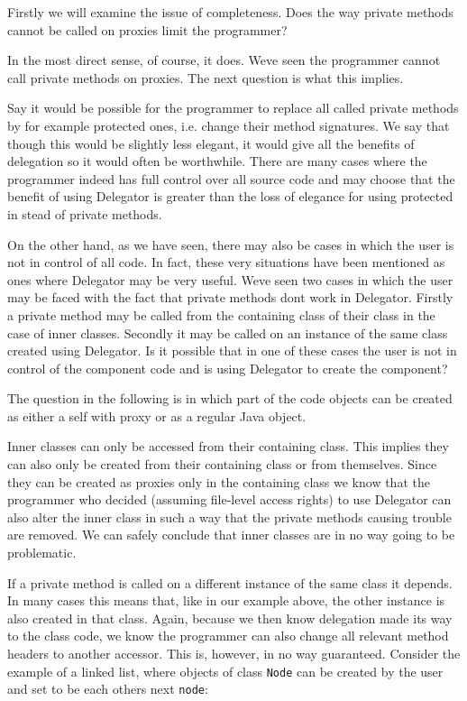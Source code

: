 \documentclass[a4paper,12pt]{book}
\begin{document}
Firstly we will examine the issue of completeness. Does the way private methods cannot be called on proxies limit the programmer?

In the most direct sense, of course, it does. Weve seen the programmer cannot call private methods on proxies. The next question is what this implies. 

Say it would be possible for the programmer to replace all called private methods by for example protected ones, i.e. change their method signatures. We say that though this would be slightly less elegant, it would give all the benefits of delegation so it would often be worthwhile. There are many cases where the programmer indeed has full control over all source code and may  choose that the benefit of using Delegator is greater than the loss of elegance for using protected in stead of private methods.

On the other hand, as we have seen, there may also be cases in which the user is not in control of all code. In fact, these very situations have been mentioned as ones where Delegator may be very useful. Weve seen two cases in which the user may be faced with the fact that private methods dont work in Delegator. Firstly a private method may be called from the containing class of their class in the case of inner classes. Secondly it may be called on an instance of the same class created using Delegator. Is it possible that in one of these cases the user is not in control of the component code and is using Delegator to create the component?

The question in the following is in which part of the code objects can be created as either a self with proxy or as a regular Java object.

Inner classes can only be accessed from their containing class. This implies they can also only be created from their containing class or from themselves. Since they can be created as proxies only in the containing class we know that the programmer who decided (assuming file-level access rights) to use Delegator can also alter the inner class in such a way that the private methods causing trouble are removed. We can safely conclude that inner classes are in no way going to be problematic.

If a private method is called on a different instance of the same class it depends. In many cases this means that, like in our example above, the other instance is also created in that class. Again, because we then know delegation made its way to the class code, we know the programmer can also change all relevant method headers to another accessor. This is, however, in no way guaranteed. Consider the example of a linked list, where objects of class \verb|Node| can be created by the user and set to be each others next \verb|node|:
\end{document}
